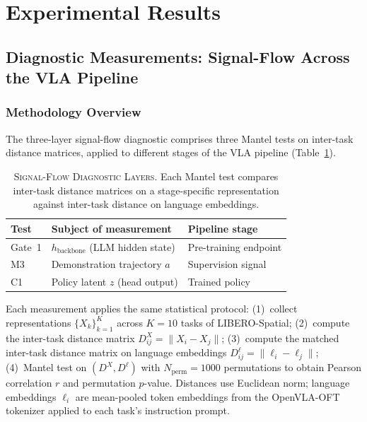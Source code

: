 
\section{Experimental Results}
\label{sec:results}

\subsection{Diagnostic Measurements: Signal-Flow Across the VLA Pipeline}
\label{sec:results:diagnostic}

\subsubsection{Methodology Overview}
\label{sec:results:diagnostic:methodology}

The three-layer signal-flow diagnostic comprises three Mantel tests on inter-task
distance matrices, applied to different stages of the VLA pipeline
(Table~\ref{tab:diagnostic_layers}).

\begin{table}[t]
\centering
\caption{\textsc{Signal-Flow Diagnostic Layers.}
Each Mantel test compares inter-task distance matrices on a stage-specific
representation against inter-task distance on language embeddings.}
\label{tab:diagnostic_layers}
\small
\begin{tabular}{lll}
\toprule
\textbf{Test} & \textbf{Subject of measurement} & \textbf{Pipeline stage} \\
\midrule
Gate~1 & $h_{\mathrm{backbone}}$ (LLM hidden state) & Pre-training endpoint \\
M3     & Demonstration trajectory $a$            & Supervision signal \\
C1     & Policy latent $z$ (head output)         & Trained policy \\
\bottomrule
\end{tabular}
\end{table}

Each measurement applies the same statistical protocol: (1)~collect representations
$\{X_k\}_{k=1}^{K}$ across $K = 10$ tasks of LIBERO-Spatial; (2)~compute the inter-task
distance matrix $D^X_{ij} = \|X_i - X_j\|$; (3)~compute the matched inter-task distance
matrix on language embeddings $D^{\ell}_{ij} = \|\ell_i - \ell_j\|$; (4)~Mantel test on
$(D^X, D^{\ell})$ with $N_{\text{perm}} = 1000$ permutations to obtain Pearson correlation
$r$ and permutation $p$-value. Distances use Euclidean norm; language embeddings $\ell_i$
are mean-pooled token embeddings from the OpenVLA-OFT tokenizer applied to each task's
instruction prompt.

